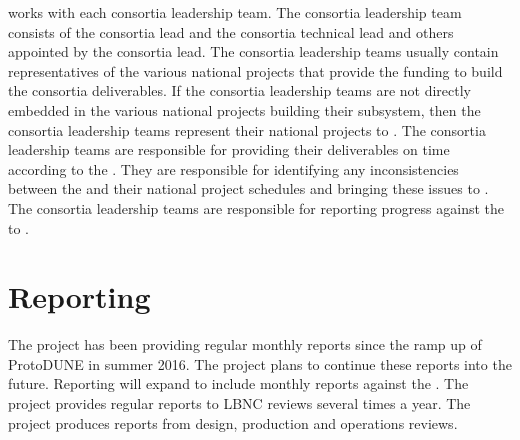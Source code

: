   works with each consortia leadership team. The
consortia leadership team consists of the consortia lead and the
consortia technical lead and others appointed by the consortia
lead. The consortia leadership teams usually contain representatives
of the various national projects that provide the funding to build the consortia
deliverables. If the consortia leadership teams are not directly
embedded in the various national projects building their subsystem,
then the consortia leadership teams represent their national projects
to . The consortia leadership teams are responsible for
providing their deliverables on time according to the
. They are responsible for identifying any inconsistencies
between the  and their national project schedules and
bringing these issues to . The consortia leadership teams
are responsible for reporting progress against the  to
.

\section{Reporting}
\label{sec:fdsp-coord-reporting}

The  project has been providing regular monthly reports
since the ramp up of ProtoDUNE in summer 2016. The project plans to
continue these reports into the future. Reporting will expand to
include monthly reports against the . The 
project provides regular reports to LBNC reviews several times a
year. The  project produces reports from design,
production and operations reviews.





%
